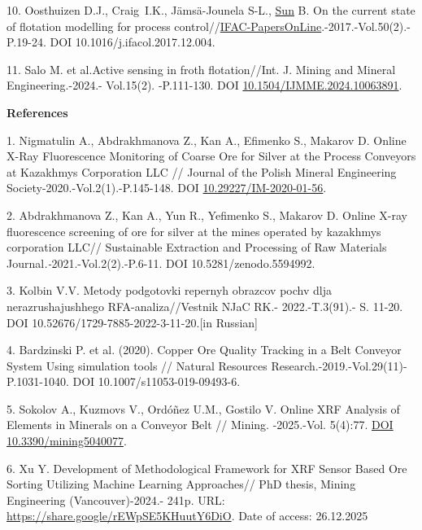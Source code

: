 \begin{refs}
10. Oosthuizen D.J., Craig~I.K., Jämsä-Jounela S-L.,
\href{https://www.sciencedirect.com/author/55460745900/bei-sun}{Sun} B.
On the current state of flotation modelling for process
control//\href{https://www.sciencedirect.com/journal/ifac-papersonline}{IFAC-PapersOnLine}.-2017.-Vol.50(2).-P.19-24.
DOI 10.1016/j.ifacol.2017.12.004.

11. Salo M. et al.Active sensing in froth flotation//Int. J. Mining and
Mineral Engineering.-2024.- Vol.15(2). -P.111-130. DOI
\href{https://doi.org/10.1504/IJMME.2024.10063891}{10.1504/IJMME.2024.10063891}.
\end{refs}

\begin{center}
{\bfseries References}
\end{center}

\begin{refs}
1. Nigmatulin A., Abdrakhmanova Z., Kan A., Efimenko S., Makarov D.
Online X-Ray Fluorescence Monitoring of Coarse Ore for Silver at the
Process Conveyors at Kazakhmys Corporation LLC // Journal of the Polish
Mineral Engineering Society-2020.-Vol.2(1).-P.145-148. DOI
\href{http://doi.org/10.29227/IM-2020-01-56}{10.29227/IM-2020-01-56}.

2. Abdrakhmanova Z., Kan A., Yun R., Yefimenko S., Makarov D. Online
X-ray fluorescence screening of ore for silver at the mines operated by
kazakhmys corporation LLC// Sustainable Extraction and Processing of Raw
Materials Journal\emph{.-}2021.-Vol.2(2).-P.6-11. DOI
10.5281/zenodo.5594992.

3. Kolbin V.V. Metody podgotovki repernyh obrazcov pochv dlja
nerazrushajushhego RFA-analiza//Vestnik NJaC RK.- 2022.-T.3(91).- S.
11-20. DOI 10.52676/1729-7885-2022-3-11-20.{[}in Russian{]}

4. Bardzinski P. et al. (2020). Copper Ore Quality Tracking in a Belt
Conveyor System Using simulation tools // Natural Resources
Research.-2019.-Vol.29(11)- P.1031-1040. DOI 10.1007/s11053-019-09493-6.

5. Sokolov A., Kuzmovs V., Ordóñez U.M., Gostilo V. Online XRF Analysis
of Elements in Minerals on a Conveyor Belt // Mining. -2025.-Vol.
5(4):77. \href{https://doi.org/10.3390/mining5040077}{DOI
10.3390/mining5040077}.

6. Xu Y. Development of Methodological Framework for XRF Sensor Based
Ore Sorting Utilizing Machine Learning Approaches// PhD thesis, Mining
Engineering (Vancouver)-2024.- 241p. URL:
\url{https://share.google/rEWpSE5KHuutY6DiO}. Date of access: 26.12.2025


\end{refs}
